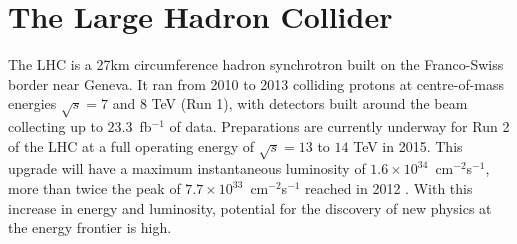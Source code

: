 
\section{The Large Hadron Collider}
\label{sec:SUSYproduction}

The LHC is a 27km circumference hadron synchrotron built on the Franco-Swiss border \cite{LHCMachine} near Geneva. It ran from 2010 to 2013 colliding protons at centre-of-mass energies $\sqrt{s}=7$ and $8$ TeV (Run 1), with detectors built around the beam collecting up to $23.3$~fb$^{-1}$ of data. Preparations are currently underway for Run 2 of the LHC at a full operating energy of $\sqrt{s}=13$ to $14$ TeV in 2015. This upgrade will have a maximum instantaneous luminosity of $1.6\times10^{34}$~cm$^{-2}$s$^{-1}$, more than twice the peak of $7.7\times10^{33}$~cm$^{-2}$s$^{-1}$ reached in 2012 \cite{LHCLuminosityIPAC13}. With this increase in energy and luminosity, potential for the discovery of new physics at the energy frontier is high.  
\\\\
